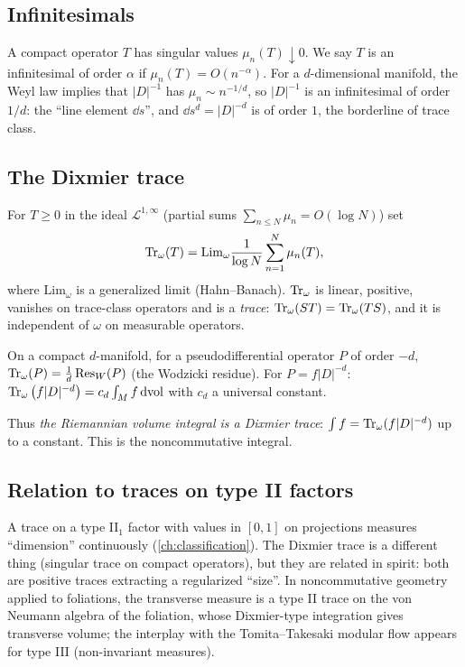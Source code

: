 \subsection{Infinitesimals}

A compact operator $T$ has singular values $\mu_n(T)\downarrow0$. We say $T$ is an infinitesimal of order $\alpha$ if $\mu_n(T)=O(n^{-\alpha})$. For a $d$-dimensional manifold, the Weyl law implies that $|D|^{-1}$ has $\mu_n\sim n^{-1/d}$, so $|D|^{-1}$ is an infinitesimal of order $1/d$: the ``line element $\dd s$'', and $\dd s^d=|D|^{-d}$ is of order $1$, the borderline of trace class.

\subsection{The Dixmier trace}

For $T\ge0$ in the ideal $\mathcal L^{1,\infty}$ (partial sums $\sum_{n\le N}\mu_n=O(\log N)$) set
\begin{equation}
\operatorname{Tr}_\omega(T)=\mathrm{Lim}_\omega\frac1{\log N}\sum_{n=1}^N\mu_n(T),
\end{equation}
where $\mathrm{Lim}_\omega$ is a generalized limit (Hahn--Banach). $\operatorname{Tr}_\omega$ is linear, positive, vanishes on trace-class operators and is a \emph{trace}: $\operatorname{Tr}_\omega(ST)=\operatorname{Tr}_\omega(TS)$, and it is independent of $\omega$ on measurable operators.

\begin{theorem}
On a compact $d$-manifold, for a pseudodifferential operator $P$ of order $-d$, $\operatorname{Tr}_\omega(P)=\frac1d\,\mathrm{Res}_W(P)$ (the Wodzicki residue). For $P=f|D|^{-d}$: $\operatorname{Tr}_\omega\big(f|D|^{-d}\big)=c_d\int_Mf\,\mathrm{d}\mathrm{vol}$ with $c_d$ a universal constant.
\end{theorem}

Thus \emph{the Riemannian volume integral is a Dixmier trace}: $\int f=\operatorname{Tr}_\omega(f|D|^{-d})$ up to a constant. This is the noncommutative integral.

\subsection{Relation to traces on type II factors}

A trace on a type II$_1$ factor with values in $[0,1]$ on projections measures ``dimension'' continuously (\cref{ch:classification}). The Dixmier trace is a different thing (singular trace on compact operators), but they are related in spirit: both are positive traces extracting a regularized ``size''. In noncommutative geometry applied to foliations, the transverse measure is a type II trace on the von Neumann algebra of the foliation, whose Dixmier-type integration gives transverse volume; the interplay with the Tomita--Takesaki modular flow appears for type III (non-invariant measures).

